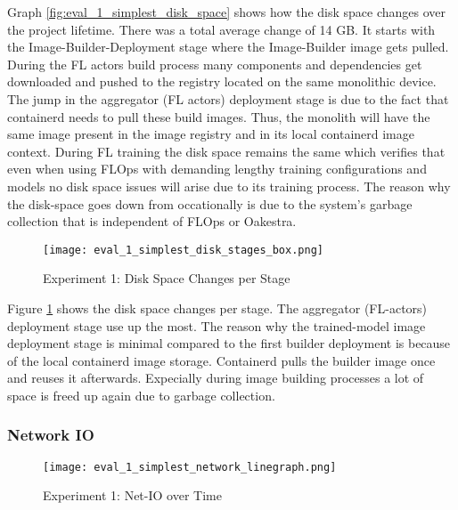 Graph \ref{fig:eval_1_simplest_disk_space} shows how the disk space changes over the project lifetime.
There was a total average change of 14 GB.
It starts with the Image-Builder-Deployment stage where the Image-Builder image gets pulled.
During the FL actors build process many components and dependencies get downloaded and pushed to the registry located on the same monolithic device.
The jump in the aggregator (FL actors) deployment stage is due to the fact that containerd needs to pull these build images.
Thus, the monolith will have the same image present in the image registry and in its local containerd image context.
During FL training the disk space remains the same which verifies that even when using FLOps with demanding lengthy training configurations and models no disk space issues will arise due to its training process.
The reason why the disk-space goes down from occationally is due to the system's garbage collection that is independent of FLOps or Oakestra.
\begin{figure}[p]
    \begin{adjustwidth}{-0.2\paperwidth}{-0.2\paperwidth}
        \centering
        \texttt{[image: eval\_1\_simplest\_disk\_stages\_box.png]}
        \caption{Experiment 1: Disk Space Changes per Stage}
        \label{fig:eval_1_simplest_disk_space_stages}
    \end{adjustwidth}
\end{figure}
Figure \ref{fig:eval_1_simplest_disk_space_stages} shows the disk space changes per stage.
The aggregator (FL-actors) deployment stage use up the most.
The reason why the trained-model image deployment stage is minimal compared to the first builder deployment is because of the local containerd image storage.
Containerd pulls the builder image once and reuses it afterwards.
Expecially during image building processes a lot of space is freed up again due to garbage collection.

\subsubsection{Network IO}

\begin{figure}[h]
    \begin{adjustwidth}{-0.2\paperwidth}{-0.2\paperwidth}
        \centering
        \texttt{[image: eval\_1\_simplest\_network\_linegraph.png]}
        \caption{Experiment 1: Net-IO over Time}
        \label{fig:eval_1_simplest_net_io}
    \end{adjustwidth}
\end{figure}

